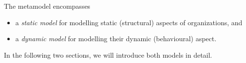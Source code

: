 The metamodel encompasses
\begin{itemize}
	\item a \textit{static model} for modelling static (structural) aspects of organizations, and
	\item a \textit{dynamic model} for modelling their dynamic (behavioural) aspect.
\end{itemize}
In the following two sections, we will introduce both models in detail.



